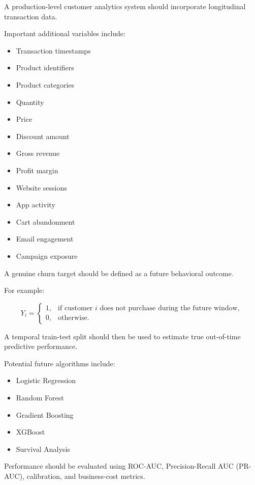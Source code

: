 \documentclass[11pt,a4paper]{article}
\begin{document}
A production-level customer analytics system should incorporate longitudinal transaction data.

Important additional variables include:

\begin{itemize}
    \item Transaction timestamps
    \item Product identifiers
    \item Product categories
    \item Quantity
    \item Price
    \item Discount amount
    \item Gross revenue
    \item Profit margin
    \item Website sessions
    \item App activity
    \item Cart abandonment
    \item Email engagement
    \item Campaign exposure
\end{itemize}

A genuine churn target should be defined as a future behavioral outcome.

For example:

\[
Y_i=
\begin{cases}
1, & \text{if customer }i\text{ does not purchase during the future window},\\
0, & \text{otherwise}.
\end{cases}
\]

A temporal train-test split should then be used to estimate true out-of-time predictive performance.

Potential future algorithms include:

\begin{itemize}
    \item Logistic Regression
    \item Random Forest
    \item Gradient Boosting
    \item XGBoost
    \item Survival Analysis
\end{itemize}

Performance should be evaluated using ROC-AUC, Precision-Recall AUC (PR-AUC), calibration, and business-cost metrics.

\end{document}

